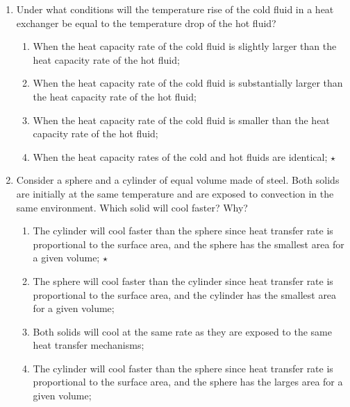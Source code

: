 \documentclass[12pts,a4paper,amsmath,amssymb,floatfix]{article}%
\begin{document}
\begin{enumerate}
%
\item Under what conditions will the temperature rise of the cold fluid in a heat exchanger be equal to the temperature
drop of the hot fluid? %
\begin{enumerate}
 \item When the heat capacity rate of the cold fluid is slightly larger than the heat capacity rate of the hot fluid; 
 \item When the heat capacity rate of the cold fluid is substantially larger than the heat capacity rate of the hot fluid; 
 \item When the heat capacity rate of the cold fluid is smaller than the heat capacity rate of the hot fluid;
 \item When the heat capacity rates of the cold and hot fluids are identical; $\star$
\end{enumerate}
%
\item Consider a sphere and a cylinder of equal volume made of steel. Both solids are initially at the same temperature and are exposed to convection in the same environment. Which solid will cool faster? Why? %
\begin{enumerate}
 \item The cylinder will cool faster than the sphere since heat transfer rate is proportional to the surface area,
and the sphere has the smallest area for a given volume; $\star$
 \item The sphere will cool faster than the cylinder since heat transfer rate is proportional to the surface area,
and the cylinder has the smallest area for a given volume;
 \item Both solids will cool at the same rate as they are exposed to the same heat transfer mechanisms;
 \item The cylinder will cool faster than the sphere since heat transfer rate is proportional to the surface area,
and the sphere has the larges area for a given volume; 
\end{enumerate}
%
%



%
\end{enumerate}
\end{document}
